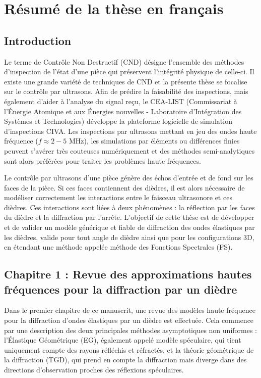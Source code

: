 \chapter[][Résumé de la thèse en français]{Résumé de la thèse en français}

\section[Introduction]{Introduction}

Le terme de Contrôle Non Destructif (CND) désigne l'ensemble des méthodes d'inspection de l'état d'une pièce qui préservent l'intégrité physique de celle-ci. Il existe une grande variété de techniques de CND et la présente thèse se focalise sur le contrôle par ultrasons. Afin de prédire la faisabilité des inspections, mais également d'aider à l'analyse du signal reçu, le CEA-LIST (Commissariat à l’Énergie Atomique et aux Énergies nouvelles - Laboratoire d’Intégration des Systèmes et Technologies) développe la plateforme logicielle de simulation d'inspections CIVA. Les inspections par ultrasons mettant en jeu des ondes haute fréquence ($f\approx2-5$ MHz), les simulations par éléments ou différences finies peuvent s'avérer très couteuses numériquement et des méthodes semi-analytiques sont alors préférées pour traiter les problèmes haute fréquences.

Le contrôle par ultrasons d'une pièce génère des échos d'entrée et de fond sur les faces de la pièce. Si ces faces contiennent des dièdres, il est alors nécessaire de modéliser correctement les interactions entre le faisceau ultrasonore et ces dièdres. Ces interactions sont liées à deux phénomènes : la réflection par les faces du dièdre et la diffraction par l'arrête. L'objectif de cette thèse est de développer et de valider un modèle générique et fiable de diffraction des ondes élastiques par les dièdres, valide pour tout angle de dièdre ainsi que pour les configurations 3D, en étendant une méthode appelée méthode des Fonctions Spectrales (FS).


\section[Résumé du chapitre 1]{Chapitre 1 : Revue des approximations hautes fréquences pour la diffraction par un dièdre}

Dans le premier chapitre de ce manuscrit, une revue des modèles haute fréquence pour la diffraction d'ondes élastiques par un dièdre est effectuée. Cela commence par une description des deux principales méthodes asymptotiques non uniformes : l'Élastique Géométrique (EG), également appelé modèle spéculaire, qui tient uniquement compte des rayons réfléchis et réfractés, et la théorie géométrique de la diffraction (TGD), qui prend en compte la diffraction mais diverge dans des directions d'observation proches des réflexions spéculaires. 

